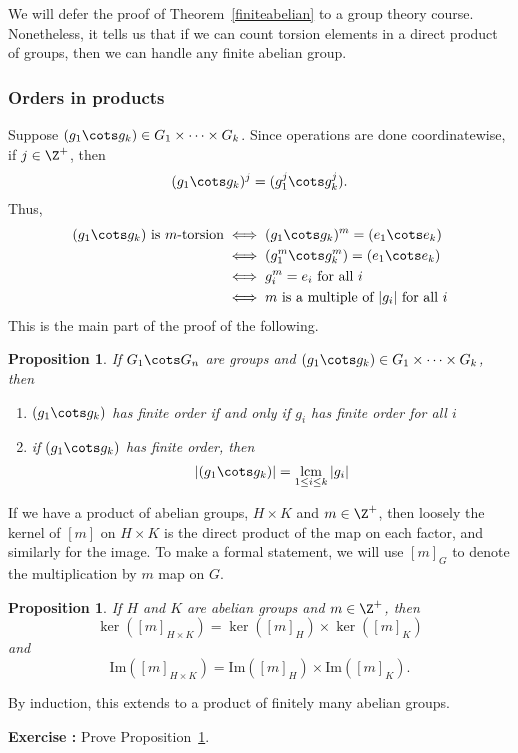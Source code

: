 \documentclass[12pt]{amsart}
\renewcommand{\Im}{\mathrm{Im}} %
\newcounter{probs}
\newenvironment{prob}{%
  \refstepcounter{probs}
  \par\medskip\noindent\textbf{Exercise \theprobs:} }{\par\medskip}
\theoremstyle{plain}
\newtheorem{prop}[thm]{Proposition}
\theoremstyle{definition}
\theoremstyle{remark}
\begin{document}
We will defer the proof of Theorem~\ref{finiteabelian} to a group
theory course.  Nonetheless, it tells us that if we can count torsion
elements in a direct product of groups, then we can handle any finite
abelian group.

\subsubsection{Orders in products}
Suppose $(g_1\cots g_k)\in G_1\times\cdots \times G_k$.  Since
operations are done coordinatewise, if $j\in\Z^+$, then
\[ (g_1\cots g_k)^j = (g_1^j\cots g_k^j).\]
Thus,
\begin{align*}
(g_1\cots g_k)\text{ is $m$-torsion}
&\iff  (g_1\cots g_k)^m=(e_1\cots  e_k) \\
&\iff  (g_1^m\cots g_k^m)=(e_1\cots  e_k) \\
&\iff g_i^m=e_i \text{ for all $i$} \\
&\iff m \text{ is a multiple of $|g_i|$ for all $i$}
\end{align*}
This is the main part of the proof of the following.
\begin{prop}
If $G_1\cots G_n$ are groups and $(g_1\cots g_k)\in G_1\times\cdots
\times G_k$, then
\begin{enumerate}
\item $(g_1\cots g_k)$ has finite order if and only if $g_i$ has
  finite order for all $i$
\item if $(g_1\cots g_k)$ has finite order, then
\[ |(g_1\cots g_k)| = \operatorname*{lcm}_{1\leq i \leq k} |g_i|\]
\end{enumerate}
\end{prop}

If we have a product of abelian groups, $H\times K$ and $m\in\Z^+$,
then loosely the kernel of $[m]$ on $H\times K$ is the direct product
of the map on each factor, and similarly for the image.  To make a
formal statement, we will use $[m]_G$ to denote the multiplication by
$m$ map on $G$.

\begin{prop}\label{prodker}
  If $H$ and $K$ are abelian groups and $m\in\Z^+$, then
\[ \ker([m]_{H\times K}) = \ker([m]_H)\times \ker([m]_K)\]
and
\[ \Im([m]_{H\times K}) = \Im([m]_H)\times \Im([m]_K).\]
\end{prop}
By induction, this extends to a product of finitely many abelian
groups.
\begin{prob}
  Prove Proposition~\ref{prodker}.
\end{prob}
\end{document}
